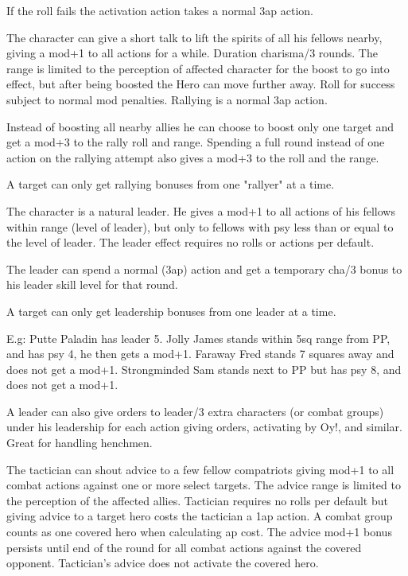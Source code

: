 If the roll fails the activation action takes a normal 3ap action.


 The character can give a short talk to lift the spirits of all his fellows nearby, giving a mod+1 to all actions for a while. Duration charisma/3 rounds. The range is limited to the perception of affected character for the boost to go into effect, but after being boosted the Hero can move further away. Roll for success subject to normal mod penalties. Rallying is a normal 3ap action.

Instead of boosting all nearby allies he can choose to boost only one target and get a mod+3 to the rally roll and range. Spending a full round instead of one action on the rallying attempt also gives a mod+3 to the roll and the range.

A target can only get rallying bonuses from one "rallyer" at a time.


 The character is a natural leader. He gives a mod+1 to all actions of his fellows within range (level of leader), but only to fellows with psy less than or equal to the level of leader. The leader effect requires no rolls or actions per default.

The leader can spend a normal (3ap) action and get a temporary cha/3 bonus to his leader skill level for that round.

A target can only get leadership bonuses from one leader at a time.

E.g: Putte Paladin has leader 5. Jolly James stands within 5sq range from PP, and has psy 4, he then gets a mod+1. Faraway Fred stands 7 squares away and does not get a mod+1. Strongminded Sam stands next to PP but has psy 8, and does not get a mod+1.

A leader can also give orders to leader/3 extra characters (or combat groups) under his leadership for each action giving orders, activating by Oy!, and similar. Great for handling henchmen.


 The tactician can shout advice to a few fellow compatriots giving mod+1 to all combat actions against one or more select targets. The advice range is limited to the perception of the affected allies. Tactician requires no rolls per default but giving advice to a target hero costs the tactician a 1ap action. A combat group counts as one covered hero when calculating ap cost. The advice mod+1 bonus persists until end of the round for all combat actions against the covered opponent. Tactician's advice does not activate the covered hero. 


